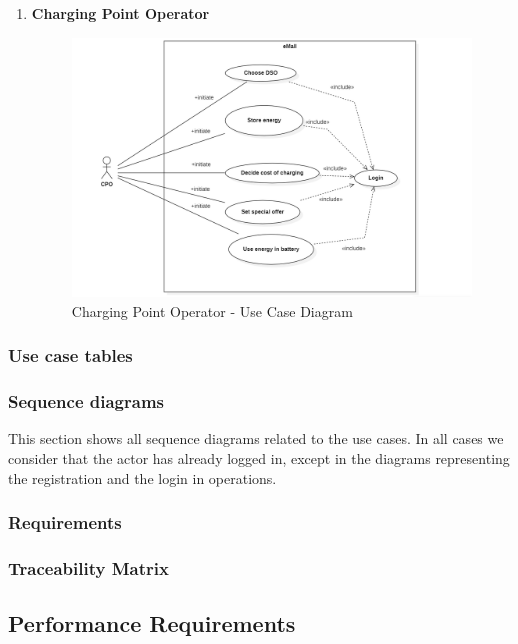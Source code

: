\begin{enumerate}
    \item \textbf{Charging Point Operator}
    \begin{figure}[H]
        \begin{center}
            \includegraphics[width=\textwidth]{img/CPO_UseCase.PNG}
            \caption{Charging Point Operator - Use Case Diagram}
        \end{center}
    \end{figure}

\end{enumerate}
\subsubsection{Use case tables}
\subsubsection{Sequence diagrams}
This section shows all sequence diagrams related to the use cases. In all cases we consider that the actor has already logged in, except in the diagrams representing the registration and the login in operations.
\subsubsection{Requirements}
\subsubsection{Traceability Matrix}
\subsection{Performance Requirements}
